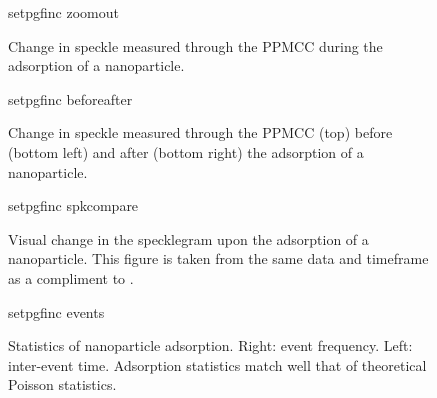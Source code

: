 \begin{figure}
	\centering
	{setpgfinc}
	{zoomout}
	\caption{Change in speckle measured through the PPMCC during the adsorption of a nanoparticle.  }
	\label{fig:zoomout}
\end{figure}

\begin{figure}
	\centering
	{setpgfinc}
	{beforeafter}
	\caption{Change in speckle measured through the PPMCC (top) before (bottom
		left) and after (bottom right) the adsorption of a nanoparticle.  }
	\label{fig:scattbeforeafterone}
\end{figure}

\begin{figure}
	\centering
	{setpgfinc}
	{spkcompare}
	\caption{Visual change in the specklegram upon the adsorption of a
		nanoparticle.  This figure is taken from the same data and timeframe
		as a compliment to .}
	\label{fig:scattspkcomparetwo}
\end{figure}

\begin{figure}
	\centering
	{setpgfinc}
	{events}
	\caption{Statistics of nanoparticle adsorption.  Right: event frequency.
		Left: inter-event time.  Adsorption statistics match well that of theoretical
		Poisson statistics.}
	\label{fig:scattbeforeafterthree}
\end{figure}

